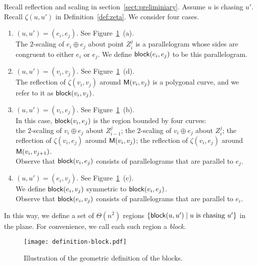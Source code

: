 \documentclass{ws-ijcga}
\begin{document}
\begin{definition}[Blocks]
Recall reflection and scaling in section~\ref{sect:preliminiary}.
Assume $u$ is chasing $u'$.
Recall $\zeta(u,u')$ in Definition~\ref{def:zeta}.
We consider four cases.
\begin{enumerate}
\item $(u,u')=(e_i,e_j)$. See Figure~\ref{fig:block_def}~(a).\\
    The $2$-scaling of $e_i\oplus e_j$ about point $Z_i^j$ is a parallelogram whose sides are congruent to either $e_i$ or $e_j$. We define $\mathsf{block}(e_i,e_j)$ to be this parallelogram.

\item $(u,u')=(v_i,v_j)$. See Figure~\ref{fig:block_def}~(d).\\
    The reflection of $\zeta(v_i,v_j)$ around $\mathsf{M}(v_i,v_j)$ is a polygonal curve, and we refer to it as $\mathsf{block}(v_i,v_j)$.

\item $(u,u')=(v_i,e_j)$. See Figure~\ref{fig:block_def}~(b).\\
    In this case, $\mathsf{block}(v_i,e_j)$ is the region bounded by four curves:\\
    the $2$-scaling of $v_i\oplus e_j$ about $Z_{i-1}^j$; the $2$-scaling of $v_i\oplus e_j$ about $Z_i^j$;
    the reflection of $\zeta(v_i,e_j)$ around $\mathsf{M}(v_i,v_j)$; the reflection of $\zeta(v_i,e_j)$ around $\mathsf{M}(v_i,v_{j+1})$.\\
    Observe that $\mathsf{block}(v_i,e_j)$ consists of parallelograms that are parallel to $e_j$.

\item $(u,u')=(e_i,v_j)$. See Figure~\ref{fig:block_def}~(c).\\
    We define $\mathsf{block}(e_i,v_j)$ symmetric to $\mathsf{block}(v_i,e_j)$.\\
    Observe that $\mathsf{block}(e_i,v_j)$ consists of parallelograms that are parallel to $e_i$.
\end{enumerate}
In this way, we define a set of $\Theta(n^2)$ regions $\{\mathsf{block}(u,u')\mid u \text{ is chasing }u'\}$ in the plane.
 For convenience, we call each such region a \emph{block}.
\end{definition}

\begin{figure}[t]
\centering\texttt{[image: definition-block.pdf]}
\caption{Illustration of the geometric definition of the blocks.}\label{fig:block_def}
\end{figure}
\end{document}
